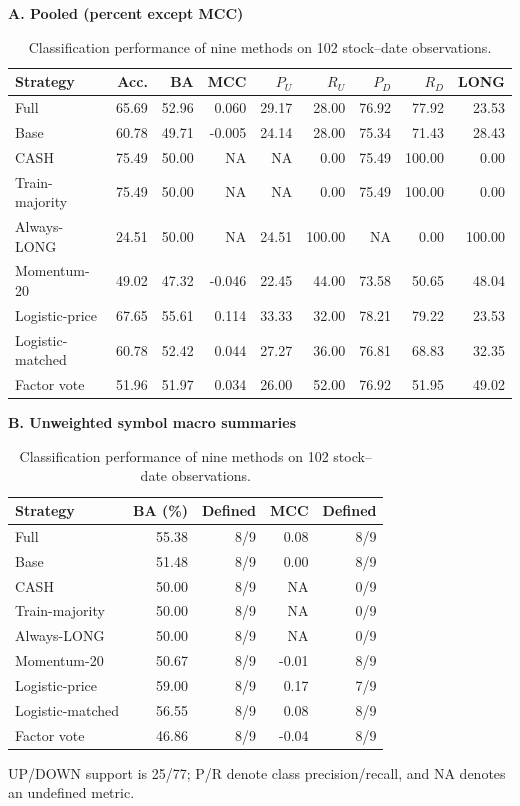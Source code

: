 \begin{table}[htb]
\centering\small
\setlength{\tabcolsep}{3pt}
\renewcommand{\arraystretch}{1.15}
\caption{Classification performance of nine methods on 102 stock--date observations.}
\label{tab:classification}
\textbf{A. Pooled (percent except MCC)}\par\smallskip
\begin{tabular}{lrrrrrrrr}
\hline
Strategy & Acc. & BA & MCC & $P_U$ & $R_U$ & $P_D$ & $R_D$ & LONG \\
\hline
Full & 65.69 & 52.96 & 0.060 & 29.17 & 28.00 & 76.92 & 77.92 & 23.53 \\
Base & 60.78 & 49.71 & -0.005 & 24.14 & 28.00 & 75.34 & 71.43 & 28.43 \\
CASH & 75.49 & 50.00 & NA & NA & 0.00 & 75.49 & 100.00 & 0.00 \\
Train-majority & 75.49 & 50.00 & NA & NA & 0.00 & 75.49 & 100.00 & 0.00 \\
Always-LONG & 24.51 & 50.00 & NA & 24.51 & 100.00 & NA & 0.00 & 100.00 \\
Momentum-20 & 49.02 & 47.32 & -0.046 & 22.45 & 44.00 & 73.58 & 50.65 & 48.04 \\
Logistic-price & 67.65 & 55.61 & 0.114 & 33.33 & 32.00 & 78.21 & 79.22 & 23.53 \\
Logistic-matched & 60.78 & 52.42 & 0.044 & 27.27 & 36.00 & 76.81 & 68.83 & 32.35 \\
Factor vote & 51.96 & 51.97 & 0.034 & 26.00 & 52.00 & 76.92 & 51.95 & 49.02 \\
\hline
\end{tabular}\par\medskip
\textbf{B. Unweighted symbol macro summaries}\par\smallskip
\begin{tabular}{lrrrr}
\hline
Strategy & BA (\%) & Defined & MCC & Defined \\
\hline
Full & 55.38 & 8/9 & 0.08 & 8/9 \\
Base & 51.48 & 8/9 & 0.00 & 8/9 \\
CASH & 50.00 & 8/9 & NA & 0/9 \\
Train-majority & 50.00 & 8/9 & NA & 0/9 \\
Always-LONG & 50.00 & 8/9 & NA & 0/9 \\
Momentum-20 & 50.67 & 8/9 & -0.01 & 8/9 \\
Logistic-price & 59.00 & 8/9 & 0.17 & 7/9 \\
Logistic-matched & 56.55 & 8/9 & 0.08 & 8/9 \\
Factor vote & 46.86 & 8/9 & -0.04 & 8/9 \\
\hline
\end{tabular}\par\medskip
\begin{minipage}{\textwidth}\footnotesize UP/DOWN support is 25/77; P/R denote class precision/recall, and NA denotes an undefined metric.\end{minipage}
\end{table}
